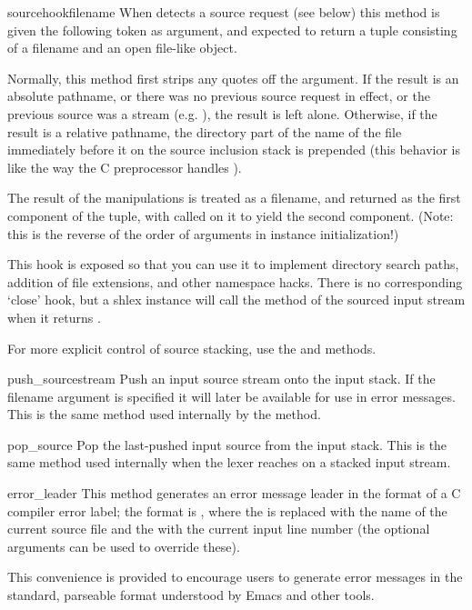 \begin{methoddesc}{sourcehook}{filename}
When  detects a source request (see
 below) this method is given the following token as
argument, and expected to return a tuple consisting of a filename and
an open file-like object.

Normally, this method first strips any quotes off the argument.  If
the result is an absolute pathname, or there was no previous source
request in effect, or the previous source was a stream
(e.g. ), the result is left alone.  Otherwise, if the
result is a relative pathname, the directory part of the name of the
file immediately before it on the source inclusion stack is prepended
(this behavior is like the way the C preprocessor handles
).

The result of the manipulations is treated as a filename, and returned
as the first component of the tuple, with
 called on it to yield the second component. (Note:
this is the reverse of the order of arguments in instance initialization!)

This hook is exposed so that you can use it to implement directory
search paths, addition of file extensions, and other namespace hacks.
There is no corresponding `close' hook, but a shlex instance will call
the  method of the sourced input stream when it
returns \EOF.

For more explicit control of source stacking, use the
 and  methods. 
\end{methoddesc}

\begin{methoddesc}{push_source}{stream}
Push an input source stream onto the input stack.  If the filename
argument is specified it will later be available for use in error
messages.  This is the same method used internally by the
 method.
\end{methoddesc}

\begin{methoddesc}{pop_source}{}
Pop the last-pushed input source from the input stack.
This is the same method used internally when the lexer reaches
\EOF on a stacked input stream.
\end{methoddesc}

\begin{methoddesc}{error_leader}{}
This method generates an error message leader in the format of a
\UNIX{} C compiler error label; the format is ,
where the  is replaced with the name of the current source
file and the  with the current input line number (the
optional arguments can be used to override these).

This convenience is provided to encourage  users to
generate error messages in the standard, parseable format understood
by Emacs and other \UNIX{} tools.
\end{methoddesc}

